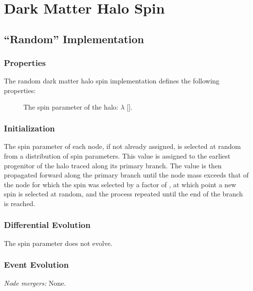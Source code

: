 \section{Dark Matter Halo Spin}\label{sec:DarkMatterHaloSpinComponent}

\subsection{``Random'' Implementation}

\subsubsection{Properties}

The random dark matter halo spin implementation defines the following properties:
\begin{description}
 \item [] The spin parameter of the halo: $\lambda$ [].
\end{description}

\subsubsection{Initialization}

The spin parameter of each node, if not already assigned, is selected at random from a distribution of spin parameters. This value is assigned to the earliest progenitor of the halo traced along its primary branch. The value is then propagated forward along the primary branch until the \gls{node} mass exceeds that of the \gls{node} for which the spin was selected by a factor of \mono{[randomSpinResetMassFactor]}, at which point a new spin is selected at random, and the process repeated until the end of the branch is reached. 

\subsubsection{Differential Evolution}

The spin parameter does not evolve.

\subsubsection{Event Evolution}

\noindent\emph{Node mergers:} None.\\

